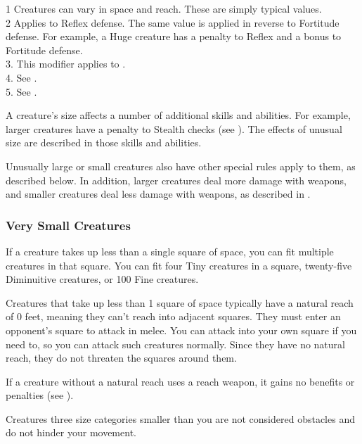 \begin{dtable*}
            1 Creatures can vary in space and reach.  These are simply typical values.  \\
            2 Applies to Reflex defense.  The same value is applied in reverse to Fortitude defense.
            For example, a Huge creature has a  penalty to Reflex and a  bonus to Fortitude defense. \\
            3. This modifier applies to . \\
            4. See . \\
            5. See . \\
        \end{dtable*}

        A creature's size affects a number of additional skills and abilities.
        For example, larger creatures have a penalty to Stealth checks (see ).
        The effects of unusual size are described in those skills and abilities.

        Unusually large or small creatures also have other special rules apply to them, as described below.
        In addition, larger creatures deal more damage with weapons, and smaller creatures deal less damage with weapons, as described in .

        \subsubsection{Very Small Creatures}
             If a creature takes up less than a single square of space, you can fit multiple creatures in that square. You can fit four Tiny creatures in a square, twenty-five Diminuitive creatures, or 100 Fine creatures.

             Creatures that take up less than 1 square of space typically have a natural reach of 0 feet, meaning they can't reach into adjacent squares. They must enter an opponent's square to attack in melee. You can attack into your own square if you need to, so you can attack such creatures normally. Since they have no natural reach, they do not threaten the squares around them.

            If a creature without a natural reach uses a reach weapon, it gains no benefits or penalties (see ).

             Creatures three size categories smaller than you are not considered obstacles and do not hinder your movement.

